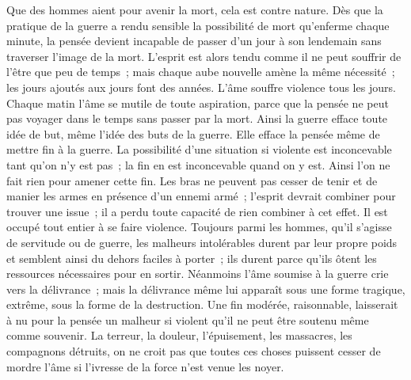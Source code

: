 {Que des hommes aient pour avenir la mort, cela est contre nature. Dès
que la pratique de la guerre a rendu sensible la possibilité de mort
qu'enferme chaque minute, la pensée devient incapable de passer d'un
jour à son lendemain sans traverser l'image de la mort. L'esprit est
alors tendu comme il ne peut souffrir de l'être que peu de temps~;
mais chaque aube nouvelle amène la même nécessité~; les jours ajoutés
aux jours font des années. L'âme souffre violence tous les jours.
Chaque matin l'âme se mutile de toute aspiration, parce que la pensée
ne peut pas voyager dans le temps sans passer par la mort. Ainsi la
guerre efface toute idée de but, même l'idée des buts de la guerre.
Elle efface la pensée même de mettre fin à la guerre. La possibilité
d'une situation si violente est inconcevable tant qu'on n'y est pas~;
la fin en est inconcevable quand on y est. Ainsi l'on ne fait rien
pour amener cette fin. Les bras ne peuvent pas cesser de tenir et de
manier les armes en présence d'un ennemi armé~; l'esprit devrait
combiner pour trouver une issue~; il a perdu toute capacité de rien
combiner à cet effet. Il est occupé tout entier à se faire violence.
Toujours parmi les hommes, qu'il s'agisse de servitude ou de guerre,
les malheurs intolérables durent par leur propre poids et semblent
ainsi du dehors faciles à porter~; ils durent parce qu'ils ôtent les
ressources nécessaires pour en sortir. Néanmoins l'âme soumise à la
guerre crie vers la délivrance~; mais la délivrance même lui apparaît
sous une forme tragique, extrême, sous la forme de la destruction.
Une fin modérée, raisonnable, laisserait à nu pour la pensée un
malheur si violent qu'il ne peut être soutenu même comme souvenir. La
terreur, la douleur, l'épuisement, les massacres, les compagnons
détruits, on ne croit pas que toutes ces choses puissent cesser de
mordre l'âme si l'ivresse de la force n'est venue les noyer.
}

